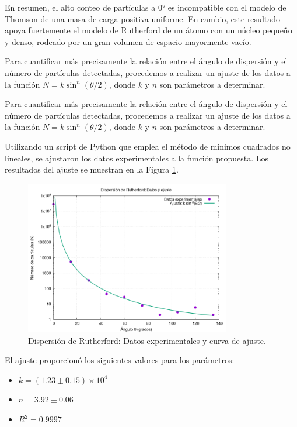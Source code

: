 \documentclass[twocolumn,a4paper,11pt]{scrartcl}
\begin{document}
En resumen, el alto conteo de partículas a 0° es incompatible con el modelo de Thomson de una masa de carga positiva uniforme. En cambio, este resultado apoya fuertemente el modelo de Rutherford de un átomo con un núcleo pequeño y denso, rodeado por un gran volumen de espacio mayormente vacío.

Para cuantificar más precisamente la relación entre el ángulo de dispersión y el número de partículas detectadas, procedemos a realizar un ajuste de los datos a la función $N = k \sin^n (\theta/2)$, donde $k$ y $n$ son parámetros a determinar.

Para cuantificar más precisamente la relación entre el ángulo de dispersión y el número de partículas detectadas, procedemos a realizar un ajuste de los datos a la función $N = k \sin^n (\theta/2)$, donde $k$ y $n$ son parámetros a determinar.

Utilizando un script de Python que emplea el método de mínimos cuadrados no lineales, se ajustaron los datos experimentales a la función propuesta. Los resultados del ajuste se muestran en la Figura \ref{fig:rutherford_fit}.

\begin{figure}[h]
\centering
\includegraphics[width=0.8\textwidth]{rutherford_fit.png}
\caption{Dispersión de Rutherford: Datos experimentales y curva de ajuste.}
\label{fig:rutherford_fit}
\end{figure}

El ajuste proporcionó los siguientes valores para los parámetros:

\begin{itemize}
    \item $k = (1.23 \pm 0.15) \times 10^4$
    \item $n = 3.92 \pm 0.06$
    \item $R^2 = 0.9997$
\end{itemize}
\end{document}
